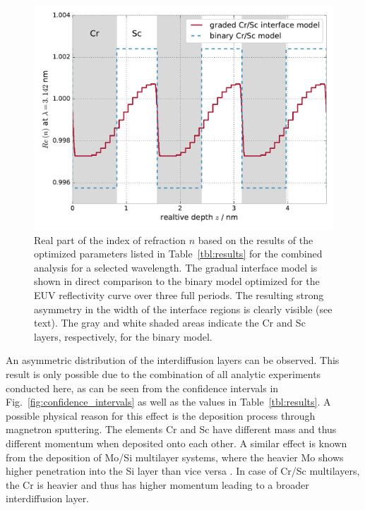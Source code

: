 \documentclass{iucr}              %
\begin{document}
\begin{figure}
  \centering
  \includegraphics[width=\textwidth]{images/real_model}
  \caption{Real part of the index of refraction $n$  based on the results of the optimized parameters listed in Table~\ref{tbl:results} for the combined analysis for a selected wavelength. The gradual interface model is shown in direct comparison to the binary model optimized for the EUV reflectivity curve over three full periods. The resulting strong asymmetry in the width of the interface regions is clearly visible (see text). The gray and white shaded areas indicate the Cr and Sc layers, respectively, for the binary model.}
  \label{fig:electron_density_profile}
\end{figure}
An asymmetric distribution of the interdiffusion layers can be observed. This result is only possible due to the combination of all analytic experiments conducted here, as can be seen from the confidence intervals in Fig.~\ref{fig:confidence_intervals} as well as the values in Table~\ref{tbl:results}. A possible physical reason for this effect is the deposition process through magnetron sputtering. The elements Cr and Sc have different mass and thus different momentum when deposited onto each other. A similar effect is known from the deposition of Mo/Si multilayer systems, where the heavier Mo shows higher penetration into the Si layer than vice versa \cite{mosi_asymmetry}. In case of Cr/Sc multilayers, the Cr is heavier and thus has higher momentum leading to a broader interdiffusion layer.
\end{document}
